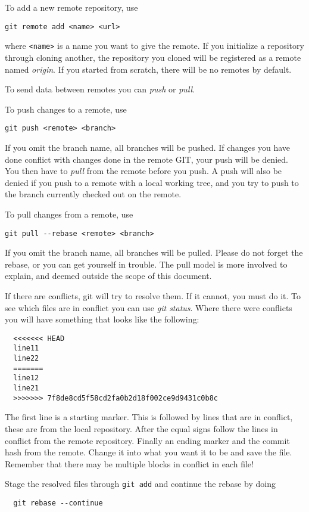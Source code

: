 To add a new remote repository, use
\begin{lstlisting}[style=shell]
  git remote add <name> <url>
\end{lstlisting}
where \texttt{<name>} is a name you want to give the remote. If you initialize a
repository through cloning another, the repository you cloned will be registered
as a remote named \emph{origin}. If you started from scratch, there will be no
remotes by default.

To send data between remotes you can \emph{push} or \emph{pull}.

To push changes to a remote, use
\begin{lstlisting}[style=shell]
  git push <remote> <branch>
\end{lstlisting}
If you omit the branch name, all branches will be pushed. If changes you have
done conflict with changes done in the remote GIT, your push will be denied. You
then have to \emph{pull} from the remote before you push. A push will also be
denied if you push to a remote with a local working tree, and you try to push to
the branch currently checked out on the remote.

To pull changes from a remote, use
\begin{lstlisting}[style=shell]
  git pull --rebase <remote> <branch>
\end{lstlisting}
If you omit the branch name, all branches will be pulled. Please do not forget
the rebase, or you can get yourself in trouble. The pull model is more involved
to explain, and deemed outside the scope of this document.

If there are conflicts, git will try to resolve them. If it cannot, you must do
it. To see which files are in conflict you can use \emph{git status}. Where
there were conflicts you will have something that looks like the following:
\begin{lstlisting}
  <<<<<<< HEAD
  line11
  line22
  =======
  line12
  line21
  >>>>>>> 7f8de8cd5f58cd2fa0b2d18f002ce9d9431c0b8c
\end{lstlisting}

The first line is a starting marker. This is followed by lines that are in
conflict, these are from the local repository. After the equal signs follow the
lines in conflict from the remote repository. Finally an ending marker and the
commit hash from the remote. Change it into what you want it to be and save the
file. Remember that there may be multiple blocks in conflict in each file!

Stage the resolved files through \texttt{git add} and continue the rebase by
doing
\begin{lstlisting}
  git rebase --continue
\end{lstlisting}
